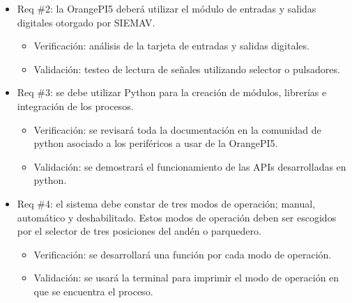 \documentclass[
11pt, %
]{charter}
\begin{document}
\begin{itemize} 
	\item Req \#2: la OrangePI5 deberá utilizar el módulo de entradas y salidas digitales otorgado por SIEMAV.
	
	\begin{itemize}
		\item Verificación: análisis de la tarjeta de entradas y salidas digitales. 
		\item Validación: testeo de lectura de señales utilizando selector o pulsadores.  
	\end{itemize}
	
	\end{itemize}

	\begin{itemize} 
		\item Req \#3: se debe utilizar Python para la creación de módulos, librerías e integración de los procesos.
		
		\begin{itemize}
			\item Verificación: se revisará toda la documentación en la comunidad de python asociado a los periféricos a usar de la OrangePI5. 
			\item Validación: se demostrará el funcionamiento de las APIs desarrolladas en python.
		\end{itemize}
		
		\end{itemize}

\begin{itemize} 
	\item Req \#4: el sistema debe constar de tres modos de operación; manual, automático y deshabilitado. Estos modos de operación deben ser escogidos por el selector de tres posiciones del andén o parquedero.
	
	\begin{itemize}
		\item Verificación: se desarrollará una función por cada modo de operación. 
		\item Validación: se usará la terminal para imprimir el modo de operación en que se encuentra el proceso.  
	\end{itemize}
	
	\end{itemize}
\end{document}
